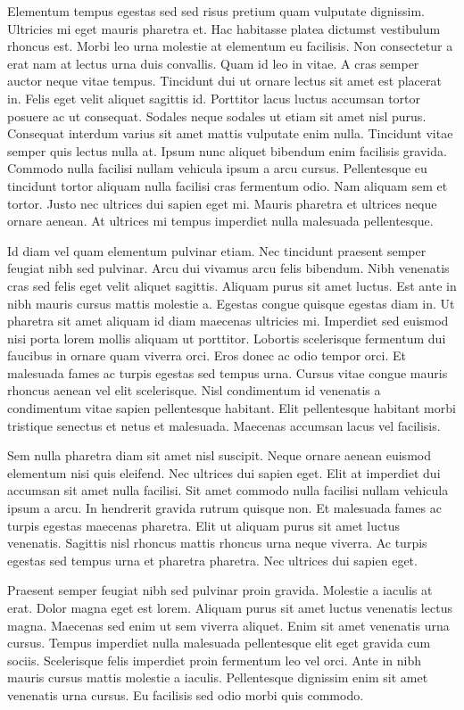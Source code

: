 \documentclass[11pt,a4paper]{article}
\begin{document}
Elementum tempus egestas sed sed risus pretium quam vulputate dignissim. Ultricies mi eget mauris pharetra et. Hac habitasse platea dictumst vestibulum rhoncus est. Morbi leo urna molestie at elementum eu facilisis. Non consectetur a erat nam at lectus urna duis convallis. Quam id leo in vitae. A cras semper auctor neque vitae tempus. Tincidunt dui ut ornare lectus sit amet est placerat in. Felis eget velit aliquet sagittis id. Porttitor lacus luctus accumsan tortor posuere ac ut consequat. Sodales neque sodales ut etiam sit amet nisl purus. Consequat interdum varius sit amet mattis vulputate enim nulla. Tincidunt vitae semper quis lectus nulla at. Ipsum nunc aliquet bibendum enim facilisis gravida. Commodo nulla facilisi nullam vehicula ipsum a arcu cursus. Pellentesque eu tincidunt tortor aliquam nulla facilisi cras fermentum odio. Nam aliquam sem et tortor. Justo nec ultrices dui sapien eget mi. Mauris pharetra et ultrices neque ornare aenean. At ultrices mi tempus imperdiet nulla malesuada pellentesque.

Id diam vel quam elementum pulvinar etiam. Nec tincidunt praesent semper feugiat nibh sed pulvinar. Arcu dui vivamus arcu felis bibendum. Nibh venenatis cras sed felis eget velit aliquet sagittis. Aliquam purus sit amet luctus. Est ante in nibh mauris cursus mattis molestie a. Egestas congue quisque egestas diam in. Ut pharetra sit amet aliquam id diam maecenas ultricies mi. Imperdiet sed euismod nisi porta lorem mollis aliquam ut porttitor. Lobortis scelerisque fermentum dui faucibus in ornare quam viverra orci. Eros donec ac odio tempor orci. Et malesuada fames ac turpis egestas sed tempus urna. Cursus vitae congue mauris rhoncus aenean vel elit scelerisque. Nisl condimentum id venenatis a condimentum vitae sapien pellentesque habitant. Elit pellentesque habitant morbi tristique senectus et netus et malesuada. Maecenas accumsan lacus vel facilisis.

Sem nulla pharetra diam sit amet nisl suscipit. Neque ornare aenean euismod elementum nisi quis eleifend. Nec ultrices dui sapien eget. Elit at imperdiet dui accumsan sit amet nulla facilisi. Sit amet commodo nulla facilisi nullam vehicula ipsum a arcu. In hendrerit gravida rutrum quisque non. Et malesuada fames ac turpis egestas maecenas pharetra. Elit ut aliquam purus sit amet luctus venenatis. Sagittis nisl rhoncus mattis rhoncus urna neque viverra. Ac turpis egestas sed tempus urna et pharetra pharetra. Nec ultrices dui sapien eget.

Praesent semper feugiat nibh sed pulvinar proin gravida. Molestie a iaculis at erat. Dolor magna eget est lorem. Aliquam purus sit amet luctus venenatis lectus magna. Maecenas sed enim ut sem viverra aliquet. Enim sit amet venenatis urna cursus. Tempus imperdiet nulla malesuada pellentesque elit eget gravida cum sociis. Scelerisque felis imperdiet proin fermentum leo vel orci. Ante in nibh mauris cursus mattis molestie a iaculis. Pellentesque dignissim enim sit amet venenatis urna cursus. Eu facilisis sed odio morbi quis commodo.
\end{document}
